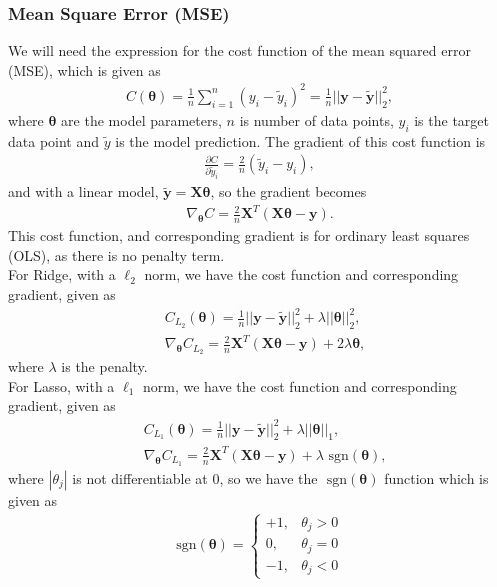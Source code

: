 \documentclass[reprint,english,notitlepage, floatfix]{revtex4-2}  %
\begin{document}
    \subsubsection{Mean Square Error (MSE)}
    We will need the expression for the cost function of the mean squared error (MSE), which is given as
    \begin{align} \label{eq: MSE costfunc OLS}
        C(\bm{\theta}) = \frac{1}{n}\sum_{i = 1}^n \left(y_i - \tilde{y}_i\right)^ 2 = \frac{1}{n}||\bm{y} - \tilde{\bm{y}}||_2^2,
    \end{align}
    where $\bm{\theta}$ are the model parameters, $n$ is number of data points, $y_i$ is the target data point and $\tilde{y}$ is the model prediction. The gradient of this cost function is
    \begin{align*}
        \frac{\partial C}{\partial \tilde{y}_i} = \frac{2}{n}\left(\tilde{y}_i - y_i\right),
     \end{align*}
     and with a linear model, $\tilde{\bm{y}} = \bm{X}\bm{\theta}$, so the gradient becomes
     \begin{align}\label{eq: gradient of MSE cost OLS}
         \nabla_{\bm{\theta}} C = \frac{2}{n} \bm{X}^T \left(\bm{X}\bm{\theta} - \bm{y}\right).
     \end{align}
     This cost function, and corresponding gradient is for ordinary least squares (OLS), as there is no penalty term. \\
     For Ridge, with a $\ell_2$ norm, we have the cost function and corresponding gradient, given as 
     \begin{align}\label{eq: MSE costfunc Ridge}
         & C_{L_2}(\bm{\theta}) = \frac{1}{n} ||\bm{y} - \tilde{\bm{y}}||_2^2 + \lambda||\bm{\theta}||_2^2,\\ \label{eq: gradient of MSE cost Ridge}
         & \nabla_{\bm{\theta}} C_{L_2} = \frac{2}{n} \bm{X}^T \left(\bm{X}\bm{\theta} - \bm{y}\right) + 2\lambda\bm{\theta},
     \end{align}
     where $\lambda$ is the penalty. \\
     For Lasso, with a $\ell_1$ norm, we have the cost function and corresponding gradient, given as
    \begin{align}\label{eq: MSE costfunc Lasso}
     & C_{L_1}(\bm{\theta}) = \frac{1}{n} ||\bm{y} - \tilde{\bm{y}}||_2^2 + \lambda||\bm{\theta}||_1,\\ \label{eq: gradient of MSE cost Lasso}
     & \nabla_{\bm{\theta}} C_{L_1} = \frac{2}{n} \bm{X}^T \left(\bm{X}\bm{\theta} - \bm{y}\right) + \lambda \text{ sgn}(\bm{\theta}),
    \end{align}
    where $|\theta_j|$ is not differentiable at 0, so we have the $\text{ sgn}(\bm{\theta})$ function which is given as
    \begin{align*}
        \text{sgn}(\bm{\theta}) = 
        \begin{cases}
            + 1, & \theta_j > 0 \\
            0, & \theta_j = 0 \\
            - 1, & \theta_j < 0
        \end{cases}
    \end{align*}
     
\end{document}
